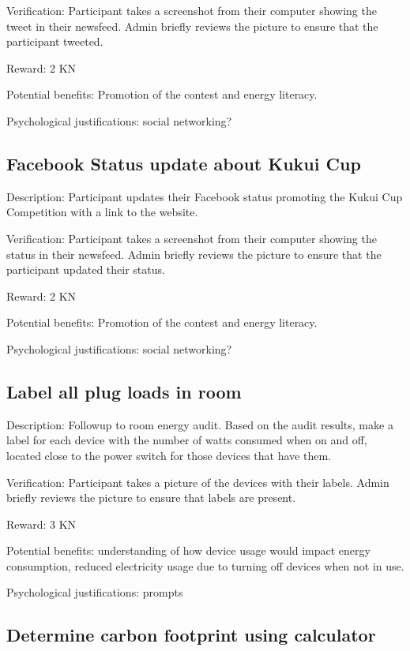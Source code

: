 Verification: Participant takes a screenshot from their computer showing the tweet in their newsfeed. Admin briefly reviews the picture to ensure that the participant tweeted.

Reward: 2 KN

Potential benefits: Promotion of the contest and energy literacy.

Psychological justifications: social networking?

\subsection{Facebook Status update about Kukui Cup}

Description: Participant updates their Facebook status promoting the Kukui Cup Competition with a link to the website.

Verification: Participant takes a screenshot from their computer showing the status in their newsfeed. Admin briefly reviews the picture to ensure that the participant updated their status.

Reward: 2 KN

Potential benefits: Promotion of the contest and energy literacy.

Psychological justifications: social networking?

\subsection{Label all plug loads in room}

Description: Followup to room energy audit. Based on the audit results, make a label for each device with the number of watts consumed when on and off, located close to the power switch for those devices that have them.

Verification: Participant takes a picture of the devices with their labels. Admin briefly reviews the picture to ensure that labels are present.

Reward: 3 KN

Potential benefits: understanding of how device usage would impact energy consumption, reduced electricity usage due to turning off devices when not in use.

Psychological justifications: prompts

\subsection{Determine carbon footprint using calculator}

